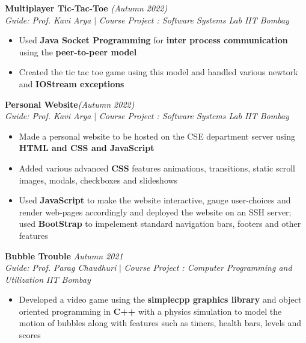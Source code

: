 \documentclass[a4paper,10pt]{article}
\begin{document}
\vspace{\baselineskip}
\vspace{-15pt}
\noindent\textbf{\large Multiplayer Tic-Tac-Toe} \hfill{\sl \small (Autumn 2022)}\\
{\it Guide: Prof. Kavi Arya} $|$ {\it Course Project : Software Systems Lab } \hfill{\it IIT Bombay}\\
\vspace{-15pt}
\begin{itemize}[itemsep = -0.65 mm, leftmargin=*]
    \item Used \textbf{Java Socket Programming} for \textbf{inter process communication} using the \textbf{peer-to-peer model}
    \item Created the tic tac toe game using this model and handled various newtork and \textbf{IOStream exceptions}
\end{itemize}
\vspace{\baselineskip}
\vspace{-15pt}
\noindent\textbf{\large Personal Website}\hfill{\sl \small (Autumn 2022)}\\
{\it Guide: Prof. Kavi Arya} $|$ {\it Course Project : Software Systems Lab } \hfill{\it IIT Bombay}
\\\vspace{-15pt}
\begin{itemize}[itemsep = -0.65 mm, leftmargin=*]
    \item Made a personal website to be hosted on the CSE department server using \textbf{HTML and CSS and JavaScript}
    \item Added various advanced \textbf{CSS} features animations, transitions, static scroll images, modals, checkboxes and slideshows
    \item Used \textbf{JavaScript} to make the website interactive, gauge user-choices and render web-pages accordingly and deployed the website on an SSH server; used \textbf{BootStrap} to impelement standard navigation bars, footers and other features
\end{itemize}
\vspace{\baselineskip}
\vspace{-15pt}
\noindent\textbf{\large Bubble Trouble} \hfill{\sl \small Autumn 2021}\\
{\it Guide: Prof. Parag Chaudhuri} $|$ {\it Course Project : Computer Programming and Utilization } \hfill{\it IIT Bombay}
\vspace{-2pt}
\begin{itemize}[itemsep = -0.65 mm, leftmargin=*]
    \item Developed a video game using the \textbf{simplecpp graphics library} and object oriented programming in \textbf{C++} with a
          physics simulation to model the motion of bubbles along with features such as timers, health bars, levels and scores
\end{itemize}
\end{document}

